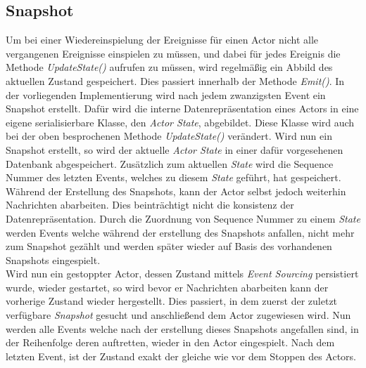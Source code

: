 \subsection{Snapshot}
\label{subsec:implementation:eventSouring:Snapshot}
Um bei einer Wiedereinspielung der Ereignisse für einen Actor nicht alle vergangenen Ereignisse einspielen zu müssen, und dabei für jedes Ereignis die Methode \textit{UpdateState()} aufrufen zu müssen, wird regelmäßig ein Abbild des aktuellen Zustand gespeichert. Dies passiert innerhalb der Methode \textit{Emit()}. In der vorliegenden Implementierung wird nach jedem zwanzigsten Event ein Snapshot erstellt. Dafür wird die interne Datenrepräsentation eines Actors in eine eigene serialisierbare Klasse, den \textit{Actor State}, abgebildet. Diese Klasse wird auch bei der oben besprochenen Methode \textit{UpdateState()} verändert. Wird nun ein Snapshot erstellt, so wird der aktuelle \textit{Actor State} in einer dafür vorgesehenen Datenbank abgespeichert. Zusätzlich zum aktuellen \textit{State} wird die Sequence Nummer des letzten Events, welches zu diesem \textit{State} geführt, hat gespeichert. Während der Erstellung des Snapshots, kann der Actor selbst jedoch weiterhin Nachrichten abarbeiten. Dies beinträchtigt nicht die konsistenz der Datenrepräsentation. Durch die Zuordnung von Sequence Nummer zu einem \textit{State} werden Events welche während der erstellung des Snapshots anfallen, nicht mehr zum Snapshot gezählt und werden später wieder auf Basis des vorhandenen Snapshots eingespielt. \\
Wird nun ein gestoppter Actor, dessen Zustand mittels \textit{Event Sourcing} persistiert wurde, wieder gestartet, so wird bevor er Nachrichten abarbeiten kann der  vorherige Zustand wieder hergestellt. Dies passiert, in dem zuerst der zuletzt verfügbare \textit{Snapshot} gesucht und anschließend dem Actor zugewiesen wird. Nun werden alle Events welche nach der erstellung dieses Snapshots angefallen sind, in der Reihenfolge deren auftretten, wieder in den Actor eingespielt. Nach dem letzten Event, ist der Zustand exakt der gleiche wie vor dem Stoppen des Actors.

